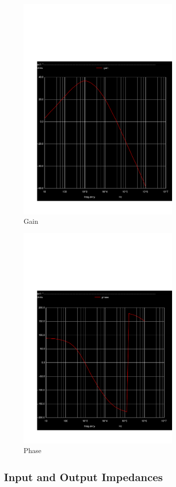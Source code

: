 \begin{figure}[H] 
\centering
\includegraphics[width = 8cm]{gain.pdf} 
\caption{Gain}
\label{phase}
\end{figure}

\begin{figure}[H] 
\centering
\includegraphics[width = 8cm]{phase.pdf} 
\caption{Phase}
\label{phase}
\end{figure}


\subsection{Input and Output Impedances}

